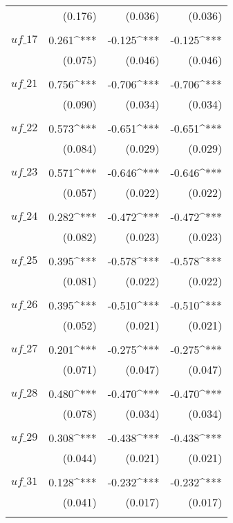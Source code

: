 \begin{apendicesenv}
\begin{footnotesize}
\begin{longtable}{@{\extracolsep{5pt}}lD{.}{.}{-3} D{.}{.}{-3} D{.}{.}{-3} }
		& (0.176) & (0.036) & (0.036) \\
		& & & \\
	   $uf\_17$ & 0.261^{***} & -0.125^{***} & -0.125^{***} \\
		& (0.075) & (0.046) & (0.046) \\ 
		& & & \\
	   $uf\_21$ & 0.756^{***} & -0.706^{***} & -0.706^{***} \\
		& (0.090) & (0.034) & (0.034) \\
		& & & \\
	   $uf\_22$ & 0.573^{***} & -0.651^{***} & -0.651^{***} \\ 
		& (0.084) & (0.029) & (0.029) \\
		& & & \\
	   $uf\_23$ & 0.571^{***} & -0.646^{***} & -0.646^{***} \\
		& (0.057) & (0.022) & (0.022) \\
		& & & \\
	   $uf\_24$ & 0.282^{***} & -0.472^{***} & -0.472^{***} \\ 
		& (0.082) & (0.023) & (0.023) \\
		& & & \\
	   $uf\_25$ & 0.395^{***} & -0.578^{***} & -0.578^{***} \\
		& (0.081) & (0.022) & (0.022) \\
		& & & \\
	   $uf\_26$ & 0.395^{***} & -0.510^{***} & -0.510^{***} \\
		& (0.052) & (0.021) & (0.021) \\
		& & & \\
	   $uf\_27$ & 0.201^{***} & -0.275^{***} & -0.275^{***} \\ 
		& (0.071) & (0.047) & (0.047) \\
		& & & \\
	   $uf\_28$ & 0.480^{***} & -0.470^{***} & -0.470^{***} \\
		& (0.078) & (0.034) & (0.034) \\
		& & & \\
	   $uf\_29$ & 0.308^{***} & -0.438^{***} & -0.438^{***} \\
		& (0.044) & (0.021) & (0.021) \\
		& & & \\
	   $uf\_31$ & 0.128^{***} & -0.232^{***} & -0.232^{***} \\ 
		& (0.041) & (0.017) & (0.017) \\
		& & & \\

\end{longtable}
\end{footnotesize}
\end{apendicesenv}

